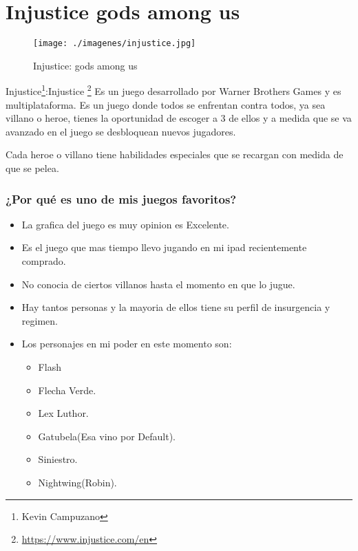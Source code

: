 \section{Injustice gods among us}

\begin{figure}[htbp]
\begin{center}
\texttt{[image: ./imagenes/injustice.jpg]}
\caption{Injustice: gods among us}
\label{Injustice: Gods Amoung us}
\end{center}
\end{figure}
Injustice\footnote{Kevin Campuzano}:Injustice \footnote{\url{https://www.injustice.com/en}} Es un juego desarrollado por Warner Brothers Games y es multiplataforma. Es un juego donde todos se enfrentan contra todos, ya sea villano o heroe, tienes la oportunidad de escoger a 3 de ellos y a medida que se va avanzado en el juego se desbloquean nuevos jugadores.

Cada heroe o villano tiene habilidades especiales que se recargan con medida de que se pelea.

\subsubsection{¿Por qué es uno de mis juegos favoritos?}
\begin{itemize}
	\item La grafica del juego es muy opinion es Excelente.
	\item Es el juego que mas tiempo llevo jugando en mi ipad recientemente comprado.
	\item No conocia de ciertos villanos hasta el momento en que lo jugue.
	\item Hay tantos personas y la mayoria de ellos tiene su perfil de insurgencia y regimen.
	\item Los personajes en mi poder en este momento son:
		\begin{itemize}
			\item Flash
			\item Flecha Verde.
			\item Lex Luthor.
			\item Gatubela(Esa vino por Default).
			\item Siniestro.
			\item Nightwing(Robin).
		\end{itemize}	
\end{itemize}